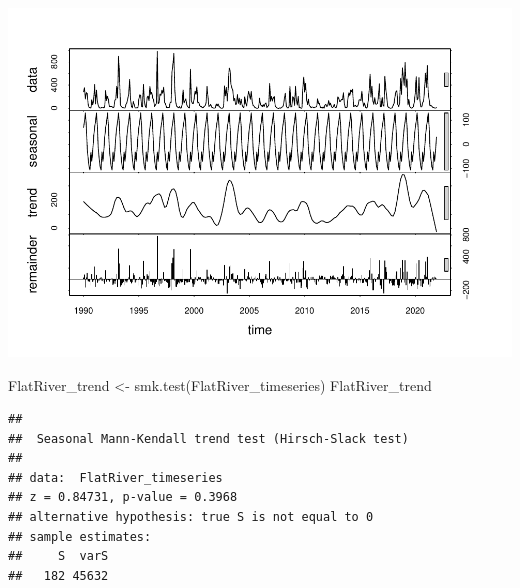 \documentclass[
  12pt,
]{article}
\newenvironment{Shaded}{\begin{snugshade}}{\end{snugshade}}
\newcommand{\AttributeTok}[1]{\textcolor[rgb]{0.77,0.63,0.00}{#1}}
\newcommand{\CommentTok}[1]{\textcolor[rgb]{0.56,0.35,0.01}{\textit{#1}}}
\newcommand{\DecValTok}[1]{\textcolor[rgb]{0.00,0.00,0.81}{#1}}
\newcommand{\FunctionTok}[1]{\textcolor[rgb]{0.00,0.00,0.00}{#1}}
\newcommand{\NormalTok}[1]{#1}
\newcommand{\OtherTok}[1]{\textcolor[rgb]{0.56,0.35,0.01}{#1}}
\newcommand{\SpecialCharTok}[1]{\textcolor[rgb]{0.00,0.00,0.00}{#1}}
\newcommand{\StringTok}[1]{\textcolor[rgb]{0.31,0.60,0.02}{#1}}
\begin{document}
\begin{Shaded}
\end{Shaded}

\includegraphics{Project_files/figure-latex/time-series analysis on Regular Water Resources-2.pdf}

\begin{Shaded}
\begin{Highlighting}[]
\NormalTok{FlatRiver\_trend }\OtherTok{\textless{}{-}} \FunctionTok{smk.test}\NormalTok{(FlatRiver\_timeseries)}
\NormalTok{FlatRiver\_trend}
\end{Highlighting}
\end{Shaded}

\begin{verbatim}
## 
##  Seasonal Mann-Kendall trend test (Hirsch-Slack test)
## 
## data:  FlatRiver_timeseries
## z = 0.84731, p-value = 0.3968
## alternative hypothesis: true S is not equal to 0
## sample estimates:
##     S  varS 
##   182 45632
\end{verbatim}
\end{document}
